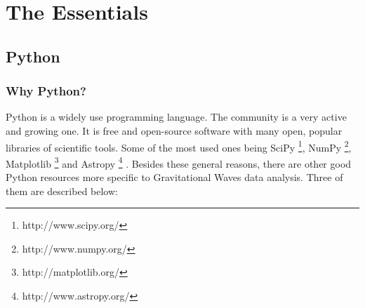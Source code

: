 \documentclass[11pt,fleqn]{book} %
\begin{document}

\chapter{The Essentials}

\section{Python}

\subsection{Why Python?}


Python is a widely use programming language. The community is a very active and growing one. It is free and open-source software with many open, popular libraries of scientific tools. Some of the most used ones being SciPy \footnote{http://www.scipy.org/}, NumPy \footnote{http://www.numpy.org/}, Matplotlib \footnote{http://matplotlib.org/} and Astropy \footnote{http://www.astropy.org/} . Besides these general reasons, there are other good Python resources more specific to Gravitational Waves data analysis. Three of them are described below:

\vspace{.3 cm}
\end{document}
